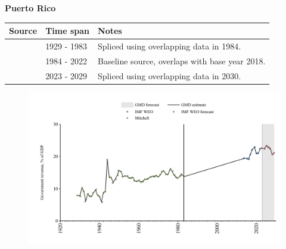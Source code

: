 \documentclass[12pt,a4paper,landscape]{article}
\begin{document}
\begin{adjustbox}{max totalsize={\paperwidth}{\paperheight},center}
\begin{minipage}[t][\textheight][t]{\textwidth}
\vspace*{0.5cm}
{}
\begin{center}
{\Large\bfseries Puerto Rico}
\end{center}
\vspace{0.5cm}
\begin{table}[H]
\centering
\small
\begin{tabular}{|l|l|l|}
\hline
\textbf{Source} & \textbf{Time span} & \textbf{Notes} \\
\hline
\rowcolor{white}\cite{Mitchell}& 1929 - 1983 &Spliced using overlapping data in 1984.\\
\rowcolor{lightgray}\cite{IMF_WEO}& 1984 - 2022 &Baseline source, overlaps with base year 2018.\\
\rowcolor{white}\cite{IMF_WEO_forecast}& 2023 - 2029 &Spliced using overlapping data in 2030.\\
\hline
\end{tabular}
\end{table}
\begin{figure}[H]
\centering
\includegraphics[width=\textwidth,height=0.6\textheight,keepaspectratio]{graphs/PRI_govrev_GDP.pdf}
\end{figure}
\end{minipage}
\end{adjustbox}
\end{document}
